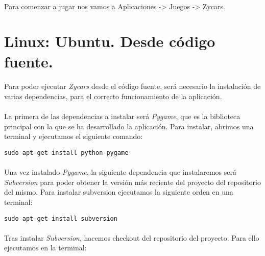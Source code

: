 \paragraph{}
Para comenzar a jugar nos vamos a Aplicaciones -> Juegos -> Zycars.

\section{Linux: Ubuntu. Desde código fuente.}

\paragraph{}
Para poder ejecutar \emph{Zycars} desde el código fuente, será necesario la instalación de varias
dependencias, para el correcto funcionamiento de la aplicación.

\paragraph{}
La primera de las dependencias a instalar será \emph{Pygame}, que es la biblioteca principal con la que
se ha desarrollado la aplicación. Para instalar, abrimos una terminal y ejecutamos el siguiente comando:

\begin{lstlisting}[style=consola, numbers=none]
sudo apt-get install python-pygame
\end{lstlisting}

\paragraph{}
Una vez instalado \emph{Pygame}, la siguiente dependencia que instalaremos será \emph{Subversion} para poder
obtener la versión más reciente del proyecto del repositorio del mismo. Para instalar subversion ejecutamos 
la siguiente orden en una terminal:

\begin{lstlisting}[style=consola, numbers=none]
sudo apt-get install subversion
\end{lstlisting}

\paragraph{}
Tras instalar \emph{Subversion}, hacemos checkout del repositorio del proyecto. Para ello ejecutamos en la terminal:

